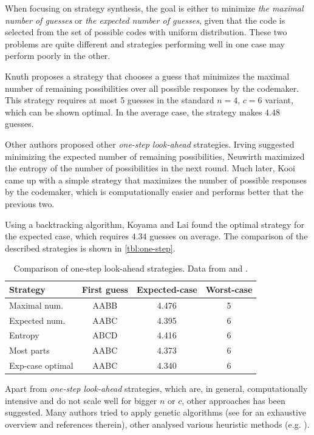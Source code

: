 When focusing on strategy synthesis, the goal is either to minimize
  \emph{the maximal number of guesses}
  or \emph{the expected number of guesses}, given that the code
  is selected from the set of possible codes with uniform distribution.
These two problems are quite different and strategies performing well
  in one case may perform poorly in the other.

Knuth\cite{mm-knuth} proposes a strategy that chooses a guess
  that minimizes the maximal number of remaining possibilities over all
  possible responses by the codemaker.
This strategy requires at most 5 guesses in the standard $n=4$, $c=6$ variant,
  which can be shown optimal.
In the average case, the strategy makes $4.48$ guesses.

Other authors proposed other \emph{one-step look-ahead} strategies.
Irving\cite{mm-expnum} suggested minimizing the expected number
  of remaining possibilities,
Neuwirth\cite{mm-entropy} maximized the entropy of the number
  of possibilities in the next round.
Much later, Kooi\cite{mm-mostparts} came up with a simple strategy that
  maximizes the number of possible responses by the codemaker,
  which is computationally easier and performs better that the previous two.

Using a backtracking algorithm, Koyama and Lai\cite{mm-exp-opt} found
  the optimal strategy for the expected case, which requires $4.34$
  guesses on average.
The comparison of the described strategies is shown in \autoref{tbl:one-step}.

\begin{table}[h]
\begin{center}
\begin{tabular}{|l|c|c|c|}
\hline Strategy & First guess & Expected-case & Worst-case \\ \hline
Maximal num. & AABB & 4.476 & 5 \\ \hline
Expected num. & AABC & 4.395 & 6 \\ \hline
Entropy & ABCD & 4.416 & 6 \\ \hline
Most parts & AABC & 4.373 & 6 \\ \hline
Exp-case optimal & AABC & 4.340 & 6 \\ \hline
\end{tabular}
\caption{Comparison of one-step look-ahead strategies. Data from \cite{mm-ville} and \cite{mm-mostparts}.}
\label{tbl:one-step}
\end{center}
\end{table}

Apart from \emph{one-step look-ahead} strategies, which are, in general,
  computationally intensive and do not scale well for bigger $n$ or $c$,
  other approaches has been suggested.
Many authors tried to apply genetic algorithms
  (see \cite{mm-ga} for an exhaustive overview and references therein),
  other analysed various heuristic methods (e.g. \cite{mm-heuristic}).

